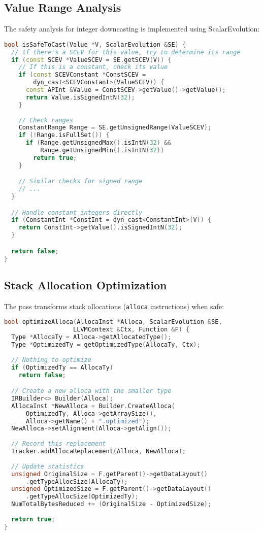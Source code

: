 \documentclass[conference]{IEEEtran}
\begin{document}
\subsection{Value Range Analysis}
The safety analysis for integer downcasting is implemented using ScalarEvolution:

\begin{lstlisting}[language=C++]
bool isSafeToCast(Value *V, ScalarEvolution &SE) {
  // If there's a SCEV for this value, try to determine its range
  if (const SCEV *ValueSCEV = SE.getSCEV(V)) {
    // If this is a constant, check its value
    if (const SCEVConstant *ConstSCEV = 
        dyn_cast<SCEVConstant>(ValueSCEV)) {
      const APInt &Value = ConstSCEV->getValue()->getValue();
      return Value.isSignedIntN(32);
    }
    
    // Check ranges
    ConstantRange Range = SE.getUnsignedRange(ValueSCEV);
    if (!Range.isFullSet()) {
      if (Range.getUnsignedMax().isIntN(32) && 
          Range.getUnsignedMin().isIntN(32))
        return true;
    }

    // Similar checks for signed range
    // ...
  }

  // Handle constant integers directly
  if (ConstantInt *ConstInt = dyn_cast<ConstantInt>(V)) {
    return ConstInt->getValue().isSignedIntN(32);
  }

  return false;
}
\end{lstlisting}

\subsection{Stack Allocation Optimization}
The pass transforms stack allocations (\texttt{alloca} instructions) when safe:

\begin{lstlisting}[language=C++]
bool optimizeAlloca(AllocaInst *Alloca, ScalarEvolution &SE, 
                   LLVMContext &Ctx, Function &F) {
  Type *AllocaTy = Alloca->getAllocatedType();
  Type *OptimizedTy = getOptimizedType(AllocaTy, Ctx);
  
  // Nothing to optimize
  if (OptimizedTy == AllocaTy)
    return false;

  // Create a new alloca with the smaller type
  IRBuilder<> Builder(Alloca);
  AllocaInst *NewAlloca = Builder.CreateAlloca(
      OptimizedTy, Alloca->getArraySize(),
      Alloca->getName() + ".optimized");
  NewAlloca->setAlignment(Alloca->getAlign());
  
  // Record this replacement
  Tracker.addAllocaReplacement(Alloca, NewAlloca);
  
  // Update statistics
  unsigned OriginalSize = F.getParent()->getDataLayout()
      .getTypeAllocSize(AllocaTy);
  unsigned OptimizedSize = F.getParent()->getDataLayout()
      .getTypeAllocSize(OptimizedTy);
  NumTotalBytesReduced += (OriginalSize - OptimizedSize);
  
  return true;
}
\end{lstlisting}
\end{document}
